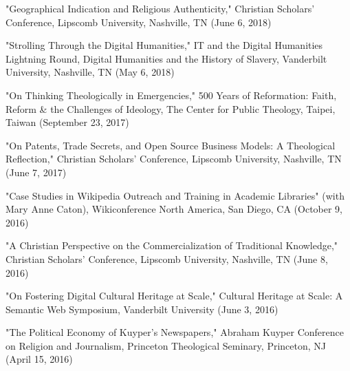\documentclass[10pt]{res} %
\begin{document}
\begin{resume}
\begin{hangparas}{.25in}{1}"Geographical Indication and Religious Authenticity," Christian Scholars’ Conference, Lipscomb University, Nashville, TN (June 6, 2018)\end{hangparas}

\begin{hangparas}{.25in}{1}"Strolling Through the Digital Humanities," IT and the Digital Humanities Lightning Round, Digital Humanities and the History of Slavery, Vanderbilt University, Nashville, TN (May 6, 2018)\end{hangparas}

\begin{hangparas}{.25in}{1}"On Thinking Theologically in Emergencies," 500 Years of Reformation: Faith, Reform \& the Challenges of Ideology, The Center for Public Theology, Taipei, Taiwan (September 23, 2017)\end{hangparas}

\begin{hangparas}{.25in}{1}"On Patents, Trade Secrets, and Open Source Business Models: A Theological Reflection," Christian Scholars’ Conference, Lipscomb University, Nashville, TN (June 7, 2017)\end{hangparas}

\begin{hangparas}{.25in}{1}"Case Studies in Wikipedia Outreach and Training in Academic Libraries" (with Mary Anne Caton), Wikiconference North America, San Diego, CA (October 9, 2016)\end{hangparas}

\begin{hangparas}{.25in}{1}"A Christian Perspective on the Commercialization of Traditional Knowledge," Christian Scholars’ Conference, Lipscomb University, Nashville, TN (June 8, 2016)\end{hangparas}

\begin{hangparas}{.25in}{1}"On Fostering Digital Cultural Heritage at Scale," Cultural Heritage at Scale: A Semantic Web Symposium, Vanderbilt University (June 3, 2016)\end{hangparas}

\begin{hangparas}{.25in}{1}"The Political Economy of Kuyper’s Newspapers," Abraham Kuyper Conference on Religion and Journalism, Princeton Theological Seminary, Princeton, NJ (April 15, 2016)\end{hangparas}


\end{resume}
\end{document}

